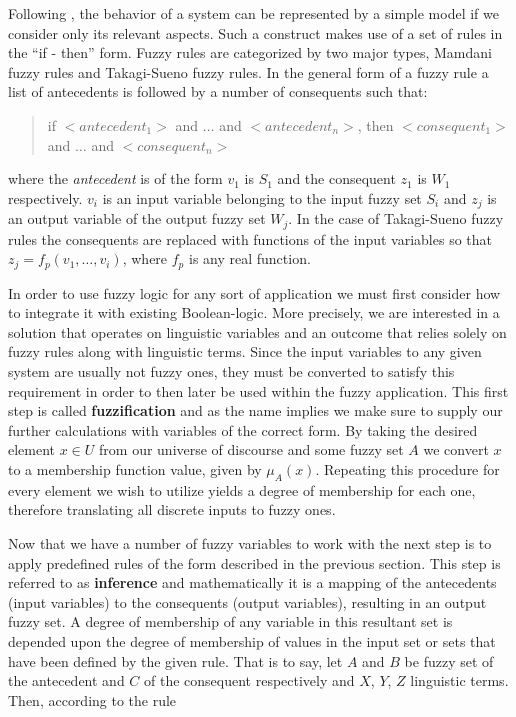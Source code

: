 Following \cite{sabri2013}, the behavior of a system can be represented by a simple model if we consider only its relevant aspects. Such a construct makes use of a set of rules in the ``if - then'' form. Fuzzy rules are categorized by two major types, Mamdani fuzzy rules and Takagi-Sueno fuzzy rules. In the general form of a fuzzy rule a list of antecedents is followed by a number of consequents such that:

\begin{quote}
	if $<antecedent_1>$ and $\ldots$ and $<antecedent_n>$, then
	$<consequent_1>$ and $\ldots$ and $<consequent_n>$
\end{quote}

\noindent where the \textit{antecedent} is of the form $v_1$ is $S_1$ and the consequent $z_1$ is $W_1$ respectively. $v_i$ is an input variable belonging to the input fuzzy set $S_i$ and $z_j$ is an output variable of the output fuzzy set $W_j$.
In the case of Takagi-Sueno fuzzy rules the consequents are replaced with functions of the input variables so that $z_j = f_p(v_1, \ldots, v_i)$, where $f_p$ is any real function.

In order to use fuzzy logic for any sort of application we must first consider how to integrate it with existing Boolean-logic. More precisely, we are interested in a solution that operates on linguistic variables and an outcome that relies solely on fuzzy rules along with linguistic terms. Since the input variables to any given system are usually not fuzzy ones, they must be converted to satisfy this requirement in order to then later be used within the fuzzy application. This first step is called \textbf{fuzzification} and as the name implies we make sure to supply our further calculations with variables of the correct form. By taking the desired element $x \in U$ from our universe of discourse and some fuzzy set $A$ we convert $x$ to a membership function value, given by $\mu_{A}(x)$. Repeating this procedure for every element we wish to utilize yields a degree of membership for each one, therefore translating all discrete inputs to fuzzy ones.

Now that we have a number of fuzzy variables to work with the next step is to apply predefined rules of the form described in the previous section. This step is referred to as \textbf{inference} and mathematically it is a mapping of the antecedents (input variables) to the consequents (output variables), resulting in an output fuzzy set. A degree of membership of any variable in this resultant set is depended upon the degree of membership of values in the input set or sets that have been defined by the given rule. That is to say, let $A$ and $B$ be fuzzy set of the antecedent and $C$ of the consequent respectively and $X$, $Y$, $Z$ linguistic terms. Then, according to the rule 
	
